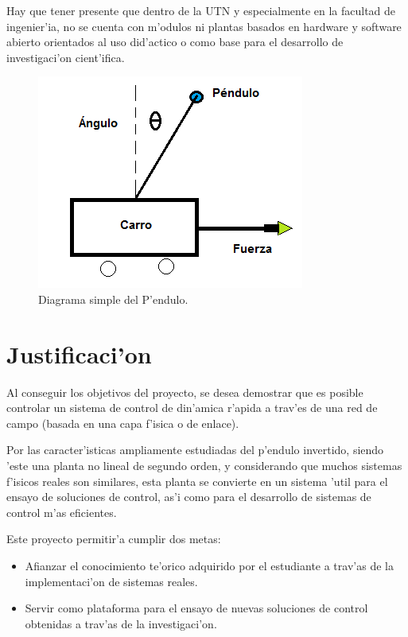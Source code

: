 Hay que tener presente que dentro de la UTN y especialmente en la facultad de ingenier'ia, no se cuenta con m'odulos ni plantas basados en hardware y software abierto orientados al uso did'actico o como base para el desarrollo de investigaci'on cient'ifica. \\


\begin{figure}[h] %
\centering
\includegraphics[scale=0.70]{pendulo1}
\caption{Diagrama simple del P'endulo.}
\label{fig:pendulo1}
\end{figure}

\section{Justificaci'on}

Al conseguir los objetivos del proyecto, se desea demostrar que es posible controlar un sistema de control de din'amica r'apida a trav'es de una red de campo (basada en una capa f'isica o de enlace).

Por las caracter'isticas ampliamente estudiadas del p'endulo invertido, siendo 'este una planta no lineal de segundo orden, y considerando que muchos sistemas f'isicos reales son similares, esta planta se convierte en un sistema 'util para el ensayo de soluciones de control, as'i como  para el desarrollo de sistemas de control m'as eficientes.

Este proyecto permitir'a cumplir dos metas: 
\begin{itemize}
	\item Afianzar el conocimiento te'orico adquirido por el estudiante a trav'as de la implementaci'on de sistemas reales.
 \item Servir como plataforma para el ensayo de nuevas soluciones de control obtenidas a trav'as de la investigaci'on.
\end{itemize}


